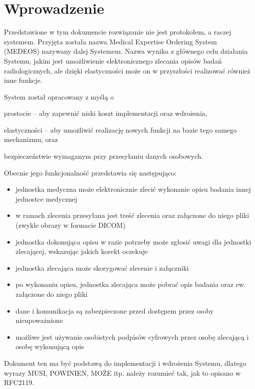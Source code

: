 \documentclass[a4paper]{article}
\begin{document}
\section{Wprowadzenie}

Przedstawione w tym dokumencie rozwiązanie nie jest protokołem, a raczej
systemem. Przyjęta została nazwa Medical Expertise Ordering System (MEDEOS)
nazywany dalej Systemem. Nazwa wynika z głównego celu działania Systemu, jakim
jest umożliwienie elektronicznego zlecania opisów badań radiologicznych, ale dzięki
elastyczności może on w przyszłości realizować również inne funkcje.

System został opracowany z myślą o 
\begin{inparaenum}
\item prostocie -- aby zapewnić niski koszt implementacji oraz wdrożenia, 
\item elastyczności -- aby umożliwić realizację nowych funkcji na bazie tego samego
mechanizmu, oraz  
\item bezpieczeństwie wymaganym przy przesyłaniu danych osobowych.
\end{inparaenum}

Obecnie jego funkcjonalność przedstawia się następująco:
\begin{itemize}
  \item jednostka medyczna może elektronicznie zlecić wykonanie opisu badania innej jednostce medycznej
  \item w ramach zlecenia przesyłana jest treść zlecenia oraz załączone do niego pliki
  (zwykle obrazy w formacie DICOM)
  \item jednostka dokonująca opisu w razie potrzeby może zgłosić uwagi dla jednostki
  zlecającej, wskazując jakich korekt oczekuje
  \item jednostka zlecająca może skorygować zlecenie i załączniki
  \item po wykonaniu opisu, jednostka zlecająca może pobrać opis badania oraz ew.
  załączone do niego pliki
  \item dane i komunikacja są zabezpieczone przed dostępem przez osoby nieupoważnione
  \item możliwe jest używanie osobistych podpisów cyfrowych przez osobę zlecającą i osobę
  wykonującą opis
\end{itemize}

Dokument ten ma być podstawą do implementacji i wdrożenia Systemu, dlatego
wyrazy MUSI, POWINIEN, MOŻE itp. należy rozumieć tak, jak to opisano w RFC2119.
\end{document}

